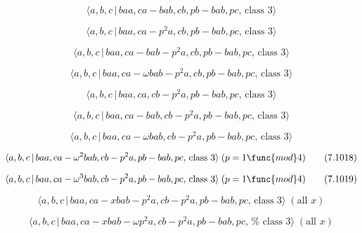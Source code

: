 \documentclass[10pt]{article}
\begin{document}
\begin{equation}
\langle a,b,c\,|\,baa,ca-bab,cb,pb-bab,pc,\,\text{class }3\rangle 
\tag{7.1011}
\end{equation}

\begin{equation}
\langle a,b,c\,|\,baa,ca-p^2a,cb,pb-bab,pc,\,\text{class }3\rangle 
\tag{7.1012}
\end{equation}

\begin{equation}
\langle a,b,c\,|\,baa,ca-bab-p^2a,cb,pb-bab,pc,\,\text{class }3\rangle 
\tag{7.1013}
\end{equation}

\begin{equation}
\langle a,b,c\,|\,baa,ca-\omega bab-p^{2}a,cb,pb-bab,pc,\,\text{class }%
3\rangle  \tag{7.1014}
\end{equation}

\begin{equation}
\langle a,b,c\,|\,baa,ca,cb-p^2a,pb-bab,pc,\,\text{class }3\rangle 
\tag{7.1015}
\end{equation}

\begin{equation}
\langle a,b,c\,|\,baa,ca-bab,cb-p^2a,pb-bab,pc,\,\text{class }3\rangle 
\tag{7.1016}
\end{equation}

\begin{equation}
\langle a,b,c\,|\,baa,ca-\omega bab,cb-p^{2}a,pb-bab,pc,\,\text{class }%
3\rangle  \tag{7.1017}
\end{equation}

\begin{equation}
\langle a,b,c\,|\,baa,ca-\omega ^{2}bab,cb-p^{2}a,pb-bab,pc,\,\text{class }%
3\rangle \;(p=1\func{mod}4)  \tag{7.1018}
\end{equation}

\begin{equation}
\langle a,b,c\,|\,baa,ca-\omega ^{3}bab,cb-p^{2}a,pb-bab,pc,\,\text{class }%
3\rangle \;(p=1\func{mod}4)  \tag{7.1019}
\end{equation}

\begin{equation}
\langle a,b,c\,|\,baa,ca-xbab-p^2a,cb-p^2a,pb-bab,pc,\,\text{class }3\rangle
\;(\text{all }x)  \tag{7.1020}
\end{equation}

\begin{equation}
\langle a,b,c\,|\,baa,ca-xbab-\omega p^{2}a,cb-p^{2}a,pb-bab,pc,\,\text{%
class }3\rangle \;(\text{all }x)  \tag{7.1021}
\end{equation}
\end{document}
